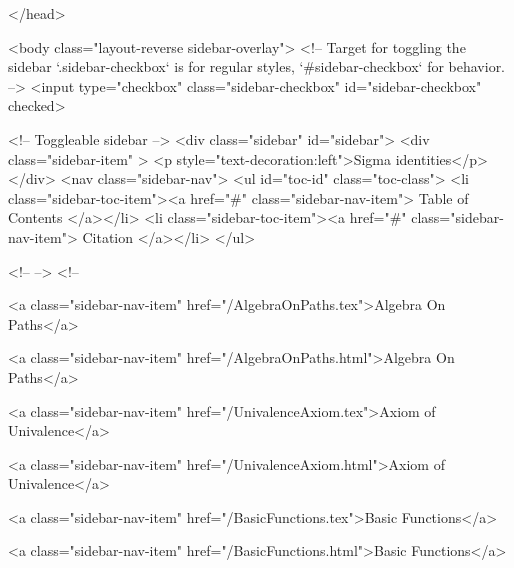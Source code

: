   
</head>




  <body class="layout-reverse sidebar-overlay">
    <!-- Target for toggling the sidebar `.sidebar-checkbox` is for regular
     styles, `#sidebar-checkbox` for behavior. -->
<input type="checkbox" class="sidebar-checkbox" id="sidebar-checkbox" checked>

<!-- Toggleable sidebar -->
<div class="sidebar" id="sidebar">
  <div class="sidebar-item" >
    <p style="text-decoration:left">Sigma identities</p>
  </div>
  <nav class="sidebar-nav">
    <ul id="toc-id" class="toc-class">
  <li class="sidebar-toc-item"><a href="#" class="sidebar-nav-item"> Table of Contents </a></li>
  <li class="sidebar-toc-item"><a href="#" class="sidebar-nav-item"> Citation </a></li>
</ul>


    <!--  -->
    <!-- 
      
    
      
    
      
    
      
        
      
    
      
        
          <a class="sidebar-nav-item" href="/AlgebraOnPaths.tex">Algebra On Paths</a>
        
      
    
      
        
          <a class="sidebar-nav-item" href="/AlgebraOnPaths.html">Algebra On Paths</a>
        
      
    
      
        
          <a class="sidebar-nav-item" href="/UnivalenceAxiom.tex">Axiom of Univalence</a>
        
      
    
      
        
          <a class="sidebar-nav-item" href="/UnivalenceAxiom.html">Axiom of Univalence</a>
        
      
    
      
        
          <a class="sidebar-nav-item" href="/BasicFunctions.tex">Basic Functions</a>
        
      
    
      
        
          <a class="sidebar-nav-item" href="/BasicFunctions.html">Basic Functions</a>
        
      
    
